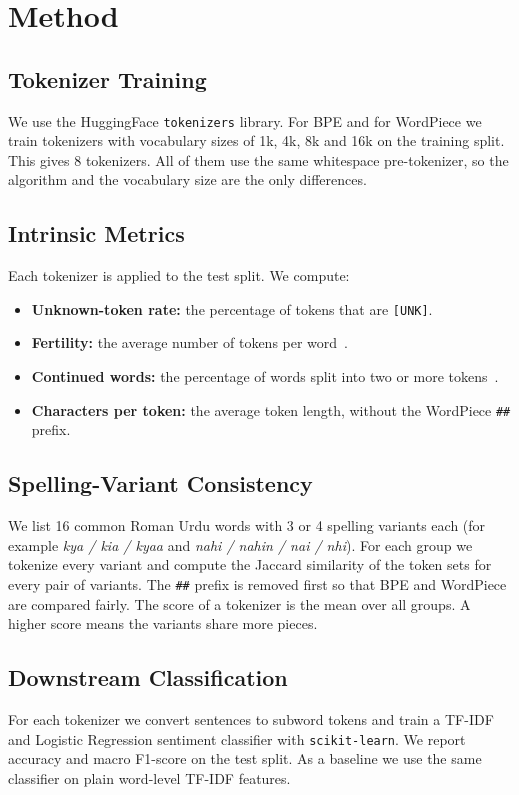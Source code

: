 \documentclass[11pt,a4paper]{article}
\begin{document}
\section{Method}
\subsection{Tokenizer Training}
We use the HuggingFace \texttt{tokenizers} library. For BPE and for WordPiece we train tokenizers with vocabulary sizes of 1k, 4k, 8k and 16k on the training split. This gives 8 tokenizers. All of them use the same whitespace pre-tokenizer, so the algorithm and the vocabulary size are the only differences.

\subsection{Intrinsic Metrics}
Each tokenizer is applied to the test split. We compute:
\begin{itemize}[leftmargin=*]
  \item \textbf{Unknown-token rate:} the percentage of tokens that are \texttt{[UNK]}.
  \item \textbf{Fertility:} the average number of tokens per word~\cite{rust2021}.
  \item \textbf{Continued words:} the percentage of words split into two or more tokens~\cite{rust2021}.
  \item \textbf{Characters per token:} the average token length, without the WordPiece \texttt{\#\#} prefix.
\end{itemize}

\subsection{Spelling-Variant Consistency}
We list 16 common Roman Urdu words with 3 or 4 spelling variants each (for example \textit{kya / kia / kyaa} and \textit{nahi / nahin / nai / nhi}). For each group we tokenize every variant and compute the Jaccard similarity of the token sets for every pair of variants. The \texttt{\#\#} prefix is removed first so that BPE and WordPiece are compared fairly. The score of a tokenizer is the mean over all groups. A higher score means the variants share more pieces.

\subsection{Downstream Classification}
For each tokenizer we convert sentences to subword tokens and train a TF-IDF and Logistic Regression sentiment classifier with \texttt{scikit-learn}. We report accuracy and macro F1-score on the test split. As a baseline we use the same classifier on plain word-level TF-IDF features.
\end{document}

